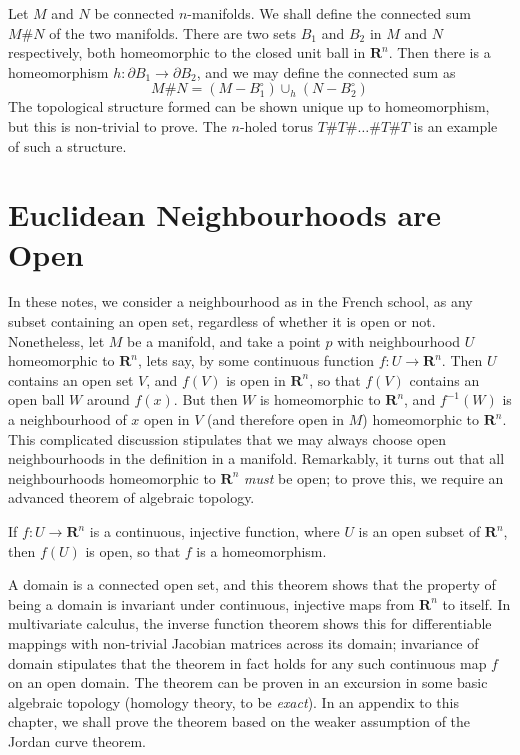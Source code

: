 \begin{example}
    Let $M$ and $N$ be connected $n$-manifolds. We shall define the connected sum $M \# N$ of the two manifolds. There are two sets $B_1$ and $B_2$ in $M$ and $N$ respectively, both homeomorphic to the closed unit ball in $\mathbf{R}^n$. Then there is a homeomorphism $h:\partial B_1 \to \partial B_2$, and we may define the connected sum as
    \[ M \# N = (M - B_1^\circ) \cup_h (N - B_2^\circ) \]
    The topological structure formed can be shown unique up to homeomorphism, but this is non-trivial to prove. The $n$-holed torus $T \# T \# \dots \# T \# T$ is an example of such a structure.
\end{example}

\section{Euclidean Neighbourhoods are Open}

In these notes, we consider a neighbourhood as in the French school, as any subset containing an open set, regardless of whether it is open or not. Nonetheless, let $M$ be a manifold, and take a point $p$ with neighbourhood $U$ homeomorphic to $\mathbf{R}^n$, lets say, by some continuous function $f: U \to \mathbf{R}^n$. Then $U$ contains an open set $V$, and $f(V)$ is open in $\mathbf{R}^n$, so that $f(V)$ contains an open ball $W$ around $f(x)$. But then $W$ is homeomorphic to $\mathbf{R}^n$, and $f^{-1}(W)$ is a neighbourhood of $x$ open in $V$ (and therefore open in $M$) homeomorphic to $\mathbf{R}^n$. This complicated discussion stipulates that we may always choose open neighbourhoods in the definition in a manifold. Remarkably, it turns out that all neighbourhoods homeomorphic to $\mathbf{R}^n$ {\it must} be open; to prove this, we require an advanced theorem of algebraic topology.


\begin{theorem}
    If $f:U \to \mathbf{R}^n$ is a continuous, injective function, where $U$ is an open subset of $\mathbf{R}^n$, then $f(U)$ is open, so that $f$ is a homeomorphism.
\end{theorem}

A domain is a connected open set, and this theorem shows that the property of being a domain is invariant under continuous, injective maps from $\mathbf{R}^n$ to itself. In multivariate calculus, the inverse function theorem shows this for differentiable mappings with non-trivial Jacobian matrices across its domain; invariance of domain stipulates that the theorem in fact holds for any such continuous map $f$ on an open domain. The theorem can be proven in an excursion in some basic algebraic topology (homology theory, to be {\it exact}). In an appendix to this chapter, we shall prove the theorem based on the weaker assumption of the Jordan curve theorem.

